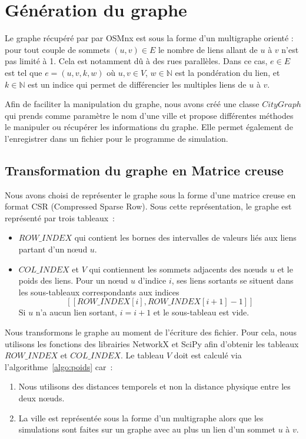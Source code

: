 \section{Génération du graphe}\label{sec:graphe}
Le graphe récupéré par par OSMnx est sous la forme d'un multigraphe orienté : pour tout couple de sommets $(u,v)\in E$ le nombre de liens allant de $u$ à $v$ n'est pas limité à 1. Cela est notamment dû à des rues parallèles. Dans ce cas, $e\in E$ est tel que $e=(u,v,k,w)$ où $u,v\in V$, $w\in\mathbb{N}$ est la pondération du lien, et $k\in\mathbb{N}$ est un indice qui permet de différencier les multiples liens de $u$ à $v$.
	
Afin de faciliter la manipulation du graphe, nous avons créé une classe $CityGraph$ qui prends comme paramètre le nom d'une ville et propose différentes méthodes le manipuler ou récupérer les informations du graphe. Elle permet également de l'enregistrer dans un fichier pour le programme de simulation. 

\subsection{Transformation du graphe en Matrice creuse}
Nous avons choisi de représenter le graphe sous la forme d'une matrice creuse en format CSR (Compressed Sparse Row). Sous cette représentation, le graphe est représenté par trois tableaux~: %
\begin{itemize}
	\item $ROW\_INDEX$ qui contient les bornes des intervalles de valeurs liés aux liens partant d'un nœud $u$.
	\item $COL\_INDEX$ et $V$ qui contiennent les sommets adjacents des nœuds $u$ et le poids des liens. Pour un nœud $u$ d'indice $i$, ses liens sortants se situent dans les sous-tableaux correspondants aux indices
	\[[\![ROW\_INDEX[i],ROW\_INDEX[i+1]-1]\!]\]
	Si $u$ n'a aucun lien sortant, $i=i+1$ et le sous-tableau est vide.
\end{itemize}
Nous transformons le graphe au moment de l'écriture des fichier. Pour cela, nous utilisons les fonctions des librairies NetworkX et SciPy %
	afin d'obtenir les tableaux $ROW\_INDEX$ et $COL\_INDEX$. Le tableau $V$ doit est calculé via l'algorithme~\ref{algo:poids} car~: \begin{enumerate}
	\item Nous utilisons des distances temporels et non la distance physique entre les deux nœuds. %
	\item La ville est représentée sous la forme d'un multigraphe alors que les simulations sont faites sur un graphe avec au plus un lien d'un sommet $u$ à $v$.
\end{enumerate}

